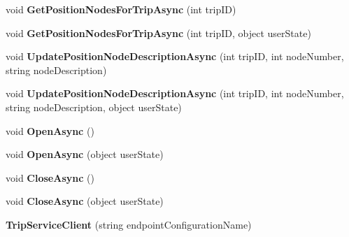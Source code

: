 \begin{DoxyCompactItemize}
\item 
\hypertarget{class_trip_service_client_a951dcd79dea5f318face9724af2fffa9}{
void {\bfseries GetPositionNodesForTripAsync} (int tripID)}
\label{class_trip_service_client_a951dcd79dea5f318face9724af2fffa9}

\item 
\hypertarget{class_trip_service_client_af0903820950892fbd3063b8af0683e1f}{
void {\bfseries GetPositionNodesForTripAsync} (int tripID, object userState)}
\label{class_trip_service_client_af0903820950892fbd3063b8af0683e1f}

\item 
\hypertarget{class_trip_service_client_ae0206ac4c1512e02325e7d9c43742586}{
void {\bfseries UpdatePositionNodeDescriptionAsync} (int tripID, int nodeNumber, string nodeDescription)}
\label{class_trip_service_client_ae0206ac4c1512e02325e7d9c43742586}

\item 
\hypertarget{class_trip_service_client_adf4c752d120c04283d6052aa1c9405dd}{
void {\bfseries UpdatePositionNodeDescriptionAsync} (int tripID, int nodeNumber, string nodeDescription, object userState)}
\label{class_trip_service_client_adf4c752d120c04283d6052aa1c9405dd}

\item 
\hypertarget{class_trip_service_client_a503f35d50a103ae9c704a8556a495317}{
void {\bfseries OpenAsync} ()}
\label{class_trip_service_client_a503f35d50a103ae9c704a8556a495317}

\item 
\hypertarget{class_trip_service_client_a766c4bf2b4c822c96d24bca6ab19de05}{
void {\bfseries OpenAsync} (object userState)}
\label{class_trip_service_client_a766c4bf2b4c822c96d24bca6ab19de05}

\item 
\hypertarget{class_trip_service_client_af7270b9fb14203468c5dc31e20a8481b}{
void {\bfseries CloseAsync} ()}
\label{class_trip_service_client_af7270b9fb14203468c5dc31e20a8481b}

\item 
\hypertarget{class_trip_service_client_a8e789b6b99bd805a926fc81c1c5b3f8a}{
void {\bfseries CloseAsync} (object userState)}
\label{class_trip_service_client_a8e789b6b99bd805a926fc81c1c5b3f8a}

\item 
\hypertarget{class_trip_service_client_a00bff7b4e57709fa66367f838cc62003}{
{\bfseries TripServiceClient} (string endpointConfigurationName)}
\label{class_trip_service_client_a00bff7b4e57709fa66367f838cc62003}


\end{DoxyCompactItemize}
